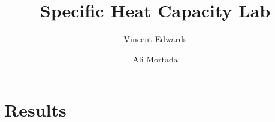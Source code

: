 \documentclass[12pt]{article} %
\title{Specific Heat Capacity Lab}
\author{Vincent Edwards}
\author{Ali Mortada}
\begin{document}
\maketitle
\newpage

\section{Results}
\end{document}
